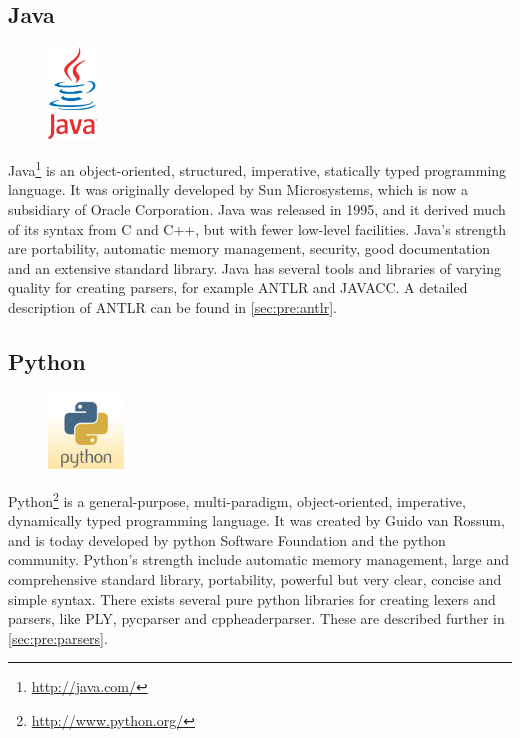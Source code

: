 \subsection{Java}
\begin{figure}
	\vspace{-30pt}
	\includegraphics[width=1.3cm]{./planning/img/java_logo}
	\vspace{-30pt}
\end{figure}
Java\footnote{\url{http://java.com/}} is an object-oriented, structured,
imperative, statically typed programming language. It was originally developed
by Sun Microsystems, which is now a subsidiary of Oracle Corporation. Java was
released in 1995, and it derived much of its syntax from C and C++, but with
fewer low-level facilities. Java’s strength are portability, automatic memory
management, security, good documentation and an extensive standard library.
Java has several tools and libraries of varying quality for creating parsers,
for example ANTLR and JAVACC. A detailed description of ANTLR can be found in 
\autoref{sec:pre:antlr}.

\subsection{Python}
\begin{figure}
	\vspace{-20pt}
	\includegraphics[width=2cm]{./planning/img/python_logo}
	\vspace{-20pt}
\end{figure}
Python\footnote{\url{http://www.python.org/}} is a general-purpose,
multi-paradigm, object-oriented, imperative, dynamically typed programming
language. It was created by Guido van Rossum, and is today developed by python
Software Foundation and the python community. Python’s strength include
automatic memory management, large and comprehensive standard library,
portability, powerful but very clear, concise and simple syntax. There exists
several pure python libraries for creating lexers and parsers, like PLY,
pycparser and cppheaderparser. These are described further in
\autoref{sec:pre:parsers}.


